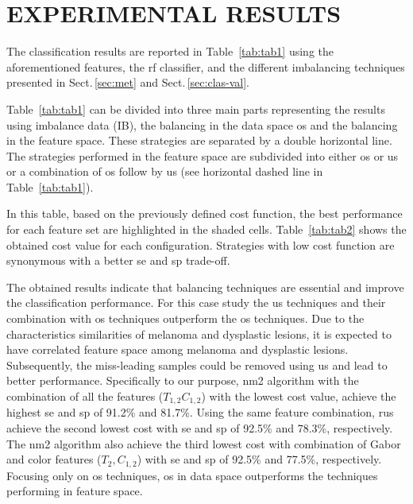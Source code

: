 \graphicspath{ {./content/Experiments-results/figures/} }

\section{\uppercase{Experimental Results}}
\label{sec:exp-res} 

\noindent The classification results are reported in Table~\ref{tab:tab1} using the aforementioned features, the \ac{rf} classifier, and the different imbalancing techniques presented in Sect.\,\ref{sec:met} and Sect.\,\ref{sec:clas-val}. 

Table~\ref{tab:tab1} can be divided into three main parts representing the results using imbalance data (IB), the balancing in the data space \ac{os} and the balancing in the feature space.
These strategies are separated by a double horizontal line.
The strategies performed in the feature space are subdivided into either \ac{os} or \ac{us} or a combination of \ac{os} follow by \ac{us} (see horizontal dashed line in Table~\ref{tab:tab1}).

In this table, based on the previously defined cost function, the best performance for each feature set are highlighted in the shaded cells.
Table~\ref{tab:tab2} shows the obtained cost value for each configuration. 
Strategies with low cost function are synonymous with a better \ac{se} and \ac{sp} trade-off.

The obtained results indicate that balancing techniques are essential and improve the classification performance. 
For this case study the \ac{us} techniques and their combination with \ac{os} techniques outperform the \ac{os} techniques. 
Due to the characteristics similarities of melanoma and dysplastic lesions, it is expected to have correlated feature space among melanoma and dysplastic lesions. 
Subsequently, the miss-leading samples could be removed using \ac{us} and lead to better performance.
Specifically to our purpose, \ac{nm2} algorithm with the combination of all the features ($T_{1,2} C_{1,2}$) with the lowest cost value, achieve the highest \ac{se} and \ac{sp} of 91.2\% and 81.7\%. 
Using the same feature combination, \ac{rus} achieve the second lowest cost with \ac{se} and \ac{sp} of 92.5\% and 78.3\%, respectively. 
The \ac{nm2} algorithm also achieve the third lowest cost with combination of Gabor and color features ($T_{2}, C_{1,2}$) with \ac{se} and \ac{sp} of 92.5\% and 77.5\%, respectively.  
Focusing only on \ac{os} techniques, \ac{os} in data space outperforms the techniques performing in feature space.

